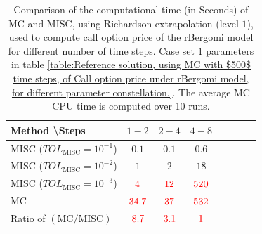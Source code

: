 \begin{table}[!h]
	\centering
	\begin{tabular}{l*{6}{c}r}
		Method \textbackslash  Steps            & $1-2$ & $2-4$ & $4-8$   \\
		\hline
		MISC ($TOL_{\text{MISC}}=10^{-1}$)  & $0.1$ & $0.1$ & $0.6$ \\
		MISC ($TOL_{\text{MISC}}=10^{-2}$)  & $1$ & $2$ & $18$   \\
		MISC ($TOL_{\text{MISC}}=10^{-3}$)  & ${\color{red}4}$ & ${\color{red}12}$ & ${\color{red}520}$   \\	
		\hline
		MC   & ${\color{red} 34.7}$  & ${\color{red}37}$  & $ {\color{red}532}$    \\
		
		\hline
		Ratio of $\left(\text{MC}/ \text{MISC} \right)$  &${\color{red}8.7}$ & ${\color{red}   3.1
		}$  & ${\color{red}1}$ \\
		\hline
	\end{tabular}
	\caption{Comparison of the computational time (in Seconds) of  MC and MISC, using Richardson extrapolation (level $1$), used to compute call option price of the rBergomi model for different number of time steps. Case set $1$ parameters in table \ref{table:Reference solution, using MC with $500$ time steps, of Call option price under rBergomi model, for different parameter constellation.}. The
		average MC CPU time is computed over 10 runs.}
	\label{Comparsion of the computational time of  MC and MISC, using Richardson extrapolation (level $1$), used to compute Call option price of rBergomi model for different number of time steps. Case set $1$ parameters}
\end{table}




\FloatBarrier

